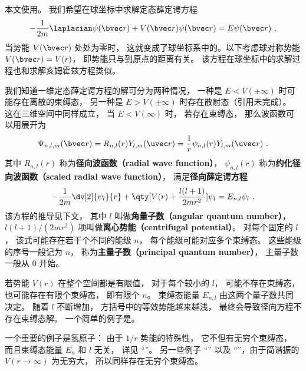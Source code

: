

本文使用。 我们希望在球坐标中求解定态薛定谔方程
\begin{equation}\label{eq_RadSE_2}
-\frac{1}{2m}\laplacian \psi(\bvec r) + V(\bvec r)\psi(\bvec r) = E\psi(\bvec r)~.
\end{equation}
当势能 $V(\bvec r)$ 处处为零时， 这就变成了球坐标系中的。以下考虑球对称势能 $V(\bvec r) = V(r)$， 即势能只与到原点的距离有关。 该方程在球坐标中的求解过程也和求解亥姆霍兹方程类似。

我们知道一维定态薛定谔方程的解可分为两种情况， 一种是 $E < V(\pm\infty)$ 时可能存在离散的束缚态， 另一种是 $E > V(\pm\infty)$ 时存在散射态（引用未完成）。 这在三维空间中同样成立， 当 $E < V(\infty)$ 时， 若存在束缚态， 那么波函数可以用展开为
\begin{equation}\label{eq_RadSE_4}
\Psi_{n, l,m}(\bvec r) = R_{n, l}(r) Y_{l,m}(\uvec r) = \frac{1}{r}\psi_{n, l}(r) Y_{l,m}(\uvec r)~.
\end{equation}
其中 $R_{n, l}(r)$ 称为\textbf{径向波函数（radial wave function）}， $\psi_{n, l}(r)$ 称为\textbf{约化径向波函数（scaled radial wave function）}， 满足\textbf{径向薛定谔方程}
\begin{equation}\label{eq_RadSE_1}
-\frac{1}{2m} \dv[2]{\psi_{l}}{r} + \qty[V(r) + \frac{l(l + 1)}{2mr^2}]\psi_{l} = E_{n, l} \psi_{l}~.
\end{equation}
该方程的推导见下文， 其中 $l$ 叫做\textbf{角量子数（angular quantum number）}， $l(l + 1)/(2mr^2)$ 项叫做\textbf{离心势能（centrifugal potential）}。 对每个固定的 $l$， 该式可能存在若干个不同的能级 $n$， 每个能级可能对应多个束缚态。 这些能级的序号一般记为 $n$， 称为\textbf{主量子数（principal quantum number）}， 主量子数一般从 0 开始。

若势能 $V(r)$ 在整个空间都是有限值， 对于每个较小的 $l$， 可能不存在束缚态， 也可能存在有限个束缚态， 即有限个 $n$。 束缚态能量 $E_{n,l}$ 由这两个量子数共同决定。 随着 $l$ 不断增加， 方括号中的等效势能越来越浅， 最终会导致径向方程不存在束缚态解。 一个简单的例子是。

一个重要的例子是氢原子： 由于 $1/r$ 势能的特殊性， 它不但有无穷个束缚态， 而且束缚态能量 $E_n$ 和 $l$ 无关， 详见 “”。 另一些例子 “” 以及 “”，由于简谐振的 $V(r\to \infty)$ 为无穷大， 所以同样存在无穷个束缚态。

